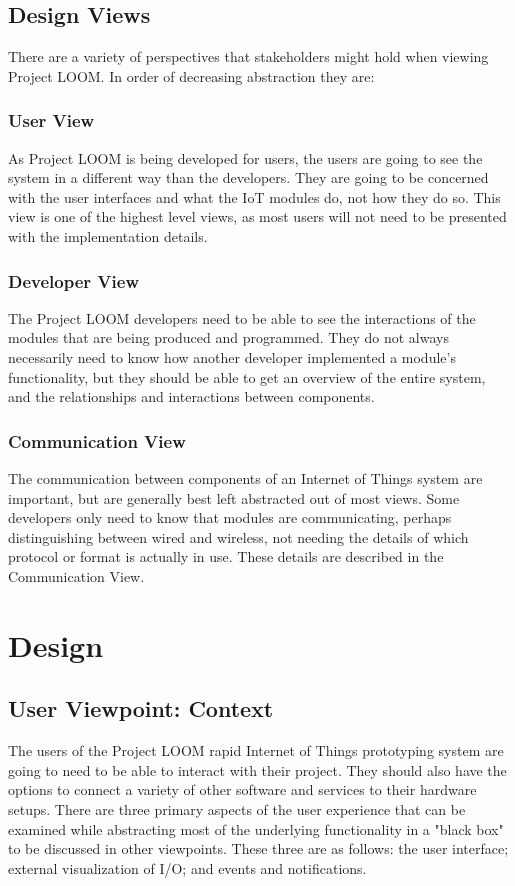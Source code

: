 \documentclass[onecolumn, draftclsnofoot,10pt, compsoc]{IEEEtran}
\begin{document}
\subsection{Design Views}
    There are a variety of perspectives that stakeholders might hold when viewing Project LOOM. In order of decreasing abstraction they are:

\subsubsection{User View}
    As Project LOOM is being developed for users, the users are going to see the system in a different way than the developers. They are going to be concerned with the user interfaces and what the IoT modules do, not how they do so. This view is one of the highest level views, as most users will not need to be presented with the implementation details.

\subsubsection{Developer View}
    The Project LOOM developers need to be able to see the interactions of the modules that are being produced and programmed. They do not always necessarily need to know how another developer implemented a module's functionality, but they should be able to get an overview of the entire system, and the relationships and interactions between components.

\subsubsection{Communication View}
    The communication between components of an Internet of Things system are important, but are generally best left abstracted out of most views. Some developers only need to know that modules are communicating, perhaps distinguishing between wired and wireless, not needing the details of which protocol or format is actually in use. These details are described in the Communication View.





\section{Design}
\subsection{User Viewpoint: Context}
    The users of the Project LOOM rapid Internet of Things prototyping system are going to need to be able to interact with their project. They should also have the options to connect a variety of other software and services to their hardware setups. There are three primary aspects of the user experience that can be examined while abstracting most of the underlying functionality in a "black box" to be discussed in other viewpoints. These three are as follows: the user interface; external visualization of I/O; and events and notifications.
\end{document}
